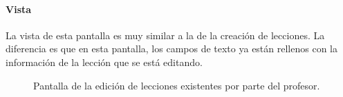 \paragraph*{Vista}
La vista de esta pantalla es muy similar a la de la creación de lecciones. La diferencia es que en esta pantalla, los campos de texto ya están rellenos con la información de la lección que se está editando.

\begin{figure}[H]%
  \centering
  \qquad
  \caption{Pantalla de la edición de lecciones existentes por parte del profesor.}%
  \label{fig:example}%
\end{figure}


